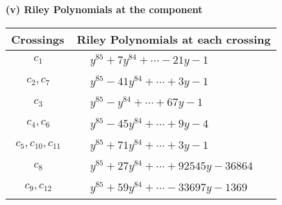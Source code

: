 \documentclass[1p]{elsarticle_modified}
\theoremstyle{definition}
\begin{document}
\newpage\renewcommand{\arraystretch}{1}
\flushleft \textbf{(v) Riley Polynomials at the component}\newline \\
\begin{tabular}{m{50pt}|m{274pt}}
Crossings & \hspace{64pt}Riley Polynomials at each crossing \\
\hline $$\begin{aligned}c_{1}\end{aligned}$$&$\begin{aligned}
&y^{85}+7 y^{84}+\cdots-21 y-1
\end{aligned}$\\
\hline $$\begin{aligned}c_{2},c_{7}\end{aligned}$$&$\begin{aligned}
&y^{85}-41 y^{84}+\cdots+3 y-1
\end{aligned}$\\
\hline $$\begin{aligned}c_{3}\end{aligned}$$&$\begin{aligned}
&y^{85}- y^{84}+\cdots+67 y-1
\end{aligned}$\\
\hline $$\begin{aligned}c_{4},c_{6}\end{aligned}$$&$\begin{aligned}
&y^{85}-45 y^{84}+\cdots+9 y-4
\end{aligned}$\\
\hline $$\begin{aligned}c_{5},c_{10},c_{11}\end{aligned}$$&$\begin{aligned}
&y^{85}+71 y^{84}+\cdots+3 y-1
\end{aligned}$\\
\hline $$\begin{aligned}c_{8}\end{aligned}$$&$\begin{aligned}
&y^{85}+27 y^{84}+\cdots+92545 y-36864
\end{aligned}$\\
\hline $$\begin{aligned}c_{9},c_{12}\end{aligned}$$&$\begin{aligned}
&y^{85}+59 y^{84}+\cdots-33697 y-1369
\end{aligned}$\\
\hline
\end{tabular}\\~\\
\end{document}
